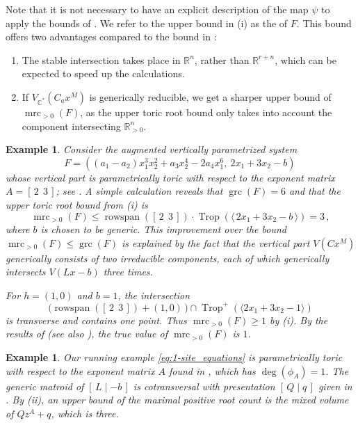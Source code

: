 \documentclass[11pt,reqno,a4paper]{amsart}
\numberwithin{equation}{section}
\theoremstyle{theoremstyle}
\theoremstyle{examplestyle}
\newtheorem{example}[theorem]{Example}
\newcommand{\CC}{\mathbb{C}}
\newcommand{\RR}{\mathbb{R}}
\DeclareMathOperator{\grc}{grc}
\DeclareMathOperator{\mrc}{mrc}
\DeclareMathOperator{\rowspan}{rowspan}
\DeclareMathOperator{\Trop}{Trop}
\newcommand{\term}{\bfemph}
\begin{document}
Note that it is not necessary to have an explicit description of the map $\psi$ to apply the bounds of .
We refer to the upper bound in (i) as the \term{upper toric root bound} of $F$. This bound offers two advantages compared to the bound in :
\begin{enumerate}
    \item The stable intersection takes place in $\RR^n$, rather than $\RR^{r+n}$, which can be expected to speed up the calculations.
    \item\label{it:sharper_bound} If $V_{\CC^*}(C_a  x^M)$ is generically reducible, we get a sharper upper bound of $\mrc_{>0}(F)$, as the upper toric root bound only takes into account the component intersecting $\RR^n_{>0}$.
\end{enumerate}

\begin{example}
Consider the augmented vertically parametrized system 
\[  F=((a_1-a_2)x_1^3x_2^2 + a_3x_2^4- 2a_4x_1^6,\  2x_1+3x_2-b)\,  \]
whose vertical part is parametrically toric with respect to the exponent matrix $A=[\,2\ \ 3\,]$; see \cite[Eq~(2.4)]{FeliuHenriksson2024}. 
A simple calculation reveals that $\grc(F)=6$
and that the upper toric root bound from (i) is 
\[\mrc_{>0}(F)\leq \rowspan([\,2\ \ 3\,])\cdot \Trop(\langle\, 2x_1+3x_2-b \,\rangle)=3\, ,\]
where $b$ is chosen to be generic. This improvement over the bound $\mrc_{>0}(F)\leq  \grc(F)$ is explained by the fact that the vertical part $V(C  x^M)$ generically consists of two irreducible components, each of which generically intersects $V(Lx-b)$ three times.

    For $h=(1,0)$ and $b = 1$, the intersection
    \[ \big(\rowspan([\,2\:\:3\,]) + (1,0)\,\big) \cap \Trop^+(\langle 2x_1+3x_2-1\rangle) \]
    is transverse and contains one point. Thus $\mrc_{>0}(F) \geq 1$ by (i). By the results of \cite[Section~3]{MullerFeliuRegensburgerConradiShiuDickenstein2015} (see also \cite[Proposition~7.1]{FeliuHenriksson2024}), the true value of $\mrc_{>0}(F)$ is $1$.
\end{example}
 

\begin{example}
\label{ex:toric_bounds_for_running_example}
Our running example \eqref{eq:1-site_equations}  is parametrically toric with respect to the exponent matrix $A$ found in , which has $\deg(\phi_A)=1$. The generic matroid of $[\,L\mid -b\,]$
is cotransversal with presentation $[\,Q\mid q\,]$ given in . By (ii), an upper bound of the maximal positive root count is  the mixed volume of $Q z^A + q$, which is three. 
\end{example}
\end{document}
